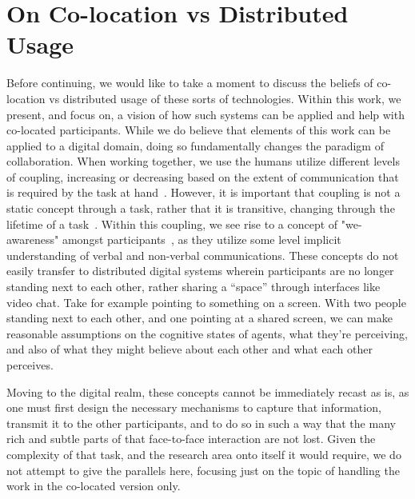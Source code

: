 \section{On Co-location vs Distributed Usage}

Before continuing, we would like to take a moment to discuss the beliefs of
co-location vs distributed usage of these sorts of technologies. Within this
work, we present, and focus on, a vision of how such systems can be applied and
help with co-located participants. While we do believe that elements of this work
can be applied to a digital domain, doing so fundamentally changes the paradigm
of collaboration. When working together, we use the humans utilize different
levels of coupling, increasing or decreasing based on the extent of
communication that is required by the task at
hand~\cite{salvador_denver_1996,olson_distance_2000}. However, it is important
that coupling is not a static concept through a task, rather that it is
transitive, changing through the lifetime of a task~\cite{jakobsen_up_2014}.
Within this coupling, we see rise to a concept of
"we-awareness" amongst participants~\cite{greenberg_implications_2016}, as they
utilize some level implicit understanding of verbal and non-verbal
communications. These concepts do not easily transfer to distributed digital
systems wherein participants are no longer standing next to each other, rather
sharing a ``space'' through interfaces like video chat. Take for example
pointing to something on a screen. With two people standing next to each other,
and one pointing at a shared screen, we can make reasonable assumptions on the
cognitive states of agents, what they're perceiving, and also of what they might
believe about each other and what each other perceives.

Moving to the digital realm, these concepts cannot be
immediately recast as is, as one must first design the necessary mechanisms to
capture that information, transmit it to the other participants, and to do so in
such a way that the many rich and subtle parts of that face-to-face interaction
are not lost. Given the complexity of that task, and the research area onto
itself it would require, we do not attempt to give the parallels here, focusing
just on the topic of handling the work in the co-located version only.
